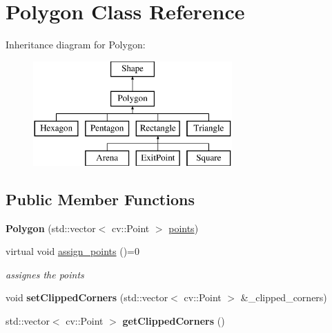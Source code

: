 \hypertarget{class_polygon}{}\section{Polygon Class Reference}
\label{class_polygon}
Inheritance diagram for Polygon\+:\begin{figure}[H]
\begin{center}
\leavevmode
\includegraphics[height=4.000000cm]{class_polygon}
\end{center}
\end{figure}
\subsection*{Public Member Functions}
\begin{DoxyCompactItemize}
\item 
\mbox{\label{class_polygon_ab64d7cd0303d3bf850a770a4553a03c2}} 
{\bfseries Polygon} (std\+::vector$<$ cv\+::\+Point $>$ \mbox{\hyperlink{class_polygon_a347474823f6113a34fdefeee276d1b9e}{points}})
\item 
\mbox{\label{class_polygon_ab2b986de126f57021357eb4bbf4d5c02}} 
virtual void \mbox{\hyperlink{class_polygon_ab2b986de126f57021357eb4bbf4d5c02}{assign\+\_\+points}} ()=0
\begin{DoxyCompactList}\small\item\em assignes the points \end{DoxyCompactList}\item 
\mbox{\label{class_polygon_a24c56c11941cffb23b12a5cd25371578}} 
void {\bfseries set\+Clipped\+Corners} (std\+::vector$<$ cv\+::\+Point $>$ \&\+\_\+clipped\+\_\+corners)
\item 
\mbox{\label{class_polygon_a675b9c01865fb77e0f6aff50e3911a28}} 
std\+::vector$<$ cv\+::\+Point $>$ {\bfseries get\+Clipped\+Corners} ()
\end{DoxyCompactItemize}
